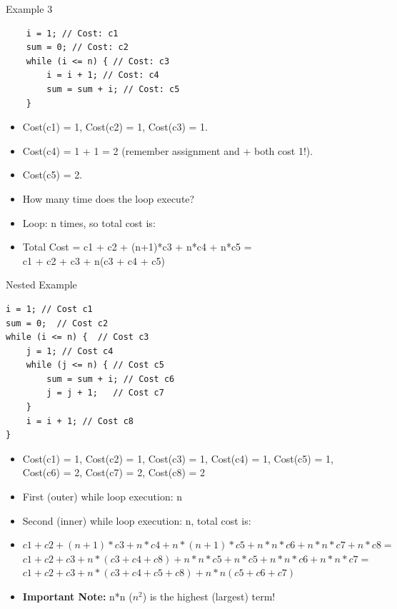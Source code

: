 \documentclass{beamer}
\begin{document}
\begin{frame}[fragile]{Example 3}
\begin{lstlisting}
    i = 1; // Cost: c1
    sum = 0; // Cost: c2
    while (i <= n) { // Cost: c3
        i = i + 1; // Cost: c4
        sum = sum + i; // Cost: c5
    } 
\end{lstlisting}
\begin{itemize}
\item <2-> Cost(c1) = 1, Cost(c2) = 1, Cost(c3) = 1.
\item <3-> Cost(c4) = 1 + 1 = 2 (remember assignment and + both cost 1!).
\item <4-> Cost(c5) = 2.
\item <5-> How many time does the loop execute?
\item <6-> Loop: n times, so total cost is:
\item <7-> Total Cost = c1 + c2 + (n+1)*c3 + n*c4 + n*c5 = \\
c1 + c2 + c3 + n(c3 + c4 + c5)
\end{itemize}
\end{frame}

\begin{frame}[fragile]{Nested Example}
\begin{lstlisting}
i = 1; // Cost c1
sum = 0;  // Cost c2
while (i <= n) {  // Cost c3
    j = 1; // Cost c4
    while (j <= n) { // Cost c5
        sum = sum + i; // Cost c6
        j = j + 1;   // Cost c7
    }
    i = i + 1; // Cost c8
}
\end{lstlisting}
\begin{itemize}
\item <2-> Cost(c1) = 1, Cost(c2) = 1, Cost(c3) = 1, Cost(c4) = 1, Cost(c5) = 1, Cost(c6) = 2, Cost(c7) = 2, Cost(c8) = 2
\item <3-> First (outer) while loop execution: n
\item <4-> Second (inner) while loop execution: n, total cost is: \\
\item <5->{\tiny $c1 + c2 + (n+1)*c3 + n*c4 + n*(n+1)*c5+n*n*c6+n*n*c7+n*c8 = $\\
$c1 + c2 + c3 + n*(c3 + c4 + c8) + n*n*c5 + n*c5 + n*n*c6+n*n*c7 = $\\
$c1 + c2 + c3 + n*(c3 + c4 + c5 + c8) + n*n(c5 + c6 + c7)$ }
\item <6-> \textbf{Important Note:} n*n ($n^2$) is the highest (largest) term!
\end{itemize}
\end{frame}
\end{document}
